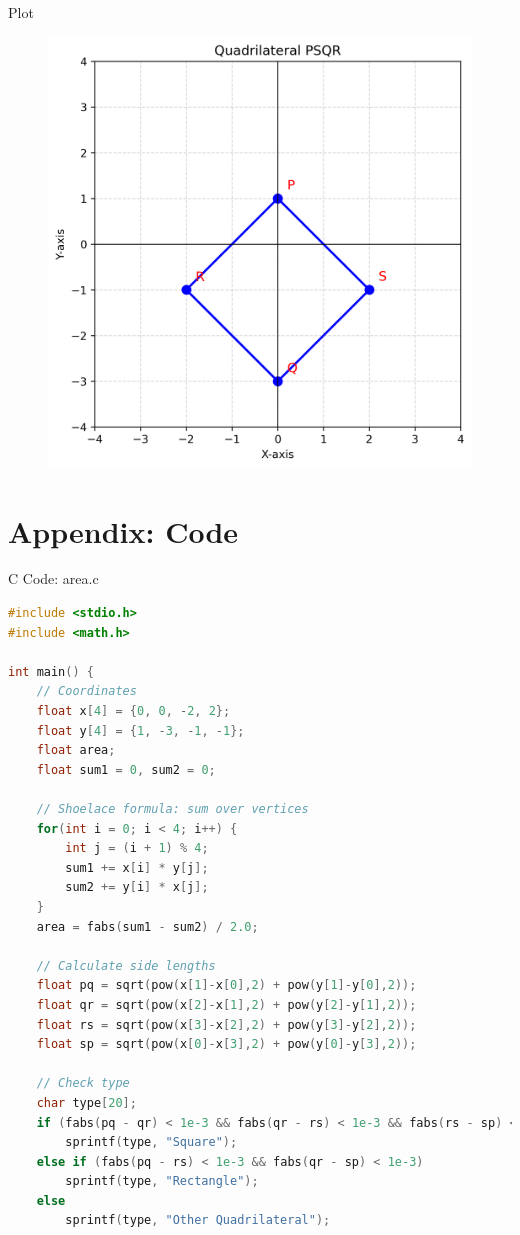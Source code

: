 \documentclass{beamer}
\numberwithin{equation}{section}
\theoremstyle{remark}
\begin{document}
\begin{frame}{Plot}
    \begin{figure}
    \centering
    \includegraphics[width=0.6\columnwidth]{figs/01.png}
    \caption{}
    \label{fig:placeholder}
\end{figure}
\end{frame}

\section*{Appendix: Code}

\begin{frame}[fragile]{C Code: area.c}
\begin{lstlisting}[language=C]
#include <stdio.h>
#include <math.h>

int main() {
    // Coordinates
    float x[4] = {0, 0, -2, 2};
    float y[4] = {1, -3, -1, -1};
    float area;
    float sum1 = 0, sum2 = 0;

    // Shoelace formula: sum over vertices
    for(int i = 0; i < 4; i++) {
        int j = (i + 1) % 4;
        sum1 += x[i] * y[j];
        sum2 += y[i] * x[j];
    }
    area = fabs(sum1 - sum2) / 2.0;

    // Calculate side lengths
    float pq = sqrt(pow(x[1]-x[0],2) + pow(y[1]-y[0],2));
    float qr = sqrt(pow(x[2]-x[1],2) + pow(y[2]-y[1],2));
    float rs = sqrt(pow(x[3]-x[2],2) + pow(y[3]-y[2],2));
    float sp = sqrt(pow(x[0]-x[3],2) + pow(y[0]-y[3],2));

    // Check type
    char type[20];
    if (fabs(pq - qr) < 1e-3 && fabs(qr - rs) < 1e-3 && fabs(rs - sp) < 1e-3)
        sprintf(type, "Square");
    else if (fabs(pq - rs) < 1e-3 && fabs(qr - sp) < 1e-3)
        sprintf(type, "Rectangle");
    else
        sprintf(type, "Other Quadrilateral");
\end{lstlisting}
\end{frame}
\end{document}
